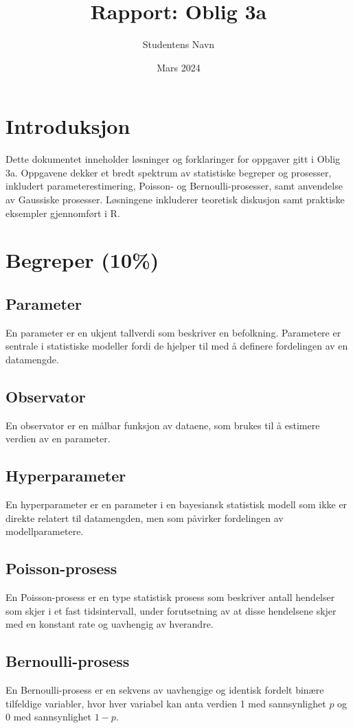 \documentclass{article}
\title{Rapport: Oblig 3a}
\author{Studentens Navn}
\date{Mars 2024}
\begin{document}
\maketitle

\section*{Introduksjon}
Dette dokumentet inneholder løsninger og forklaringer for oppgaver gitt i Oblig 3a. Oppgavene dekker et bredt spektrum av statistiske begreper og prosesser, inkludert parameterestimering, Poisson- og Bernoulli-prosesser, samt anvendelse av Gaussiske prosesser. Løsningene inkluderer teoretisk diskusjon samt praktiske eksempler gjennomført i R.

\section{Begreper (10\%)}
\subsection*{Parameter}
En parameter er en ukjent tallverdi som beskriver en befolkning. Parametere er sentrale i statistiske modeller fordi de hjelper til med å definere fordelingen av en datamengde.

\subsection*{Observator}
En observator er en målbar funksjon av dataene, som brukes til å estimere verdien av en parameter.

\subsection*{Hyperparameter}
En hyperparameter er en parameter i en bayesiansk statistisk modell som ikke er direkte relatert til datamengden, men som påvirker fordelingen av modellparametere.

\subsection*{Poisson-prosess}
En Poisson-prosess er en type statistisk prosess som beskriver antall hendelser som skjer i et fast tidsintervall, under forutsetning av at disse hendelsene skjer med en konstant rate og uavhengig av hverandre.

\subsection*{Bernoulli-prosess}
En Bernoulli-prosess er en sekvens av uavhengige og identisk fordelt binære tilfeldige variabler, hvor hver variabel kan anta verdien 1 med sannsynlighet \(p\) og 0 med sannsynlighet \(1-p\).
\end{document}
